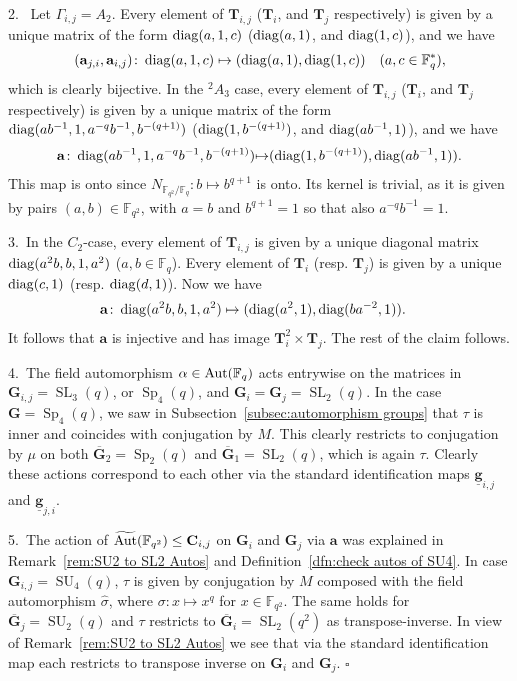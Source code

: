 \documentclass[12pt]{amsart}
\theoremstyle{definition}
\newcommand{\epf}{\qed}
\newcommand{\ul}{\underline}
\newcommand{\twA}{{}^2\! {A}}
\newcommand{\Aut}{\mathop{\rm Aut}\nolimits}
\renewcommand{\bar}{\overline}
\newcommand{\diag}{\mathop{\rm diag}\nolimits}
\DeclareMathOperator{\SL}{SL}
\newcommand{\FF}{{\mathbb F}}
\DeclareMathOperator{\SU}{SU}
\DeclareMathOperator{\Sp}{Sp}
\renewcommand{\hat}{\widehat}
\newcommand{\trin}{\tau}
\renewcommand{\qed}{\hfill $\square$}
\newcommand{\amgrpC}{{\mathbf{C}}}
\newcommand{\amgrpG}{{\mathbf{G}}}
\newcommand{\amgrpT}{{\mathbf{T}}}
\newcommand{\ama}{{\mathbf a}}
\newcommand{\famg}{\ul{\mathbf g}}
\newcommand{\bamgrpG}{\bar{\amgrpG}}
\newcommand{\liediag}{\Gamma}
\begin{document}
2.~
Let $\liediag_{i,j}=A_2$.
Every element of $\amgrpT_{i,j}$  ($\amgrpT_i$, and $\amgrpT_j$ respectively) is given by a unique matrix of the form $\diag(a,1,c)$ ($\diag(a,1)$, and $\diag(1,c)$), and  we have 
\begin{align*}
(\ama_{j,i},\ama_{i,j})\colon \diag(a,1,c)\mapsto (\diag(a,1),\diag(1,c)) && (a,c\in \FF_q^*),
\end{align*}
which is clearly bijective. 
In the $\twA_3$ case, every element of  $\amgrpT_{i,j}$  ($\amgrpT_i$, and $\amgrpT_j$ respectively) is given by a unique matrix of the form $\diag(ab^{-1},1,a^{-q}b^{-1},b^{-(q+1)})$ ($\diag(1,b^{-(q+1)})$, and $\diag(ab^{-1},1)$), and we have 
\begin{align*}
\ama\colon \diag(ab^{-1},1,a^{-q}b^{-1},b^{-(q+1)}){\mapsto} (\diag(1,b^{-(q+1)}),\diag(ab^{-1},1)).
\end{align*}
This map is onto since $N_{\FF_{q^2}/\FF_q}\colon b\mapsto b^{q+1}$ is onto. Its kernel is trivial, as it is given by pairs $(a,b)\in \FF_{q^2}$, with $a=b$ and $b^{q+1}=1$ so that also $a^{-q}b^{-1}=1$.

3.~In the $C_2$-case,  every element of $\amgrpT_{i,j}$ is given by a unique diagonal matrix $\diag(a^2b, b,1,a^2)$ ($a,b\in \FF_q$).
Every element of $\amgrpT_i$ (resp. $\amgrpT_j$) is given by a unique $\diag(c,1)$ (resp. $\diag(d,1)$).
Now we have
\begin{align*}
\ama&\colon\diag(a^2b, b,1,a^2)\mapsto (\diag(a^2,1), \diag(ba^{-2},1)).
\end{align*}
It follows that $\ama$ is injective and has image 
 $\amgrpT_i^2\times\amgrpT_j$.
The rest of the claim follows.

4.~The field automorphism $\alpha\in \Aut(\FF_q)$ acts entrywise on the matrices in $\amgrpG_{i,j}=\SL_3(q)$, or  $\Sp_4(q)$, and $\amgrpG_i=\amgrpG_j=\SL_2(q)$.   In the case $\amgrpG=\Sp_4(q)$, we saw in Subsection~\ref{subsec:automorphism groups} that $\trin$ is inner and coincides with conjugation by $M$. This clearly restricts to conjugation by $\mu$ on both $\bamgrpG_2=\Sp_2(q)$ and $\bamgrpG_1=\SL_2(q)$, which is again $\trin$. Clearly these actions correspond to each other via the standard identification maps $\famg_{i,j}$ and $\famg_{j,i}$.

5.~The action of $\widetilde{\Aut}(\FF_{q^2})\le \amgrpC_{i,j}$ on $\amgrpG_i$ and $\amgrpG_j$ via $\ama$ was explained in Remark~\ref{rem:SU2 to SL2 Autos} and Definition~\ref{dfn:check autos of SU4}.
In case $\amgrpG_{i,j}=\SU_4(q)$, $\trin$ is given by conjugation by $M$ composed with the field automorphism 
$\hat{\sigma}$, where $\sigma\colon x\mapsto x^q$ for $x\in \FF_{q^2}$. The same holds for $\bamgrpG_j=\SU_2(q)$ and $\trin$ restricts to $\bamgrpG_i=\SL_2(q^2)$ as transpose-inverse.
In view of Remark~\ref{rem:SU2 to SL2 Autos} we see that via the standard identification map each restricts to 
 transpose inverse on $\amgrpG_i$ and $\amgrpG_j$. 
\epf
\end{document}
